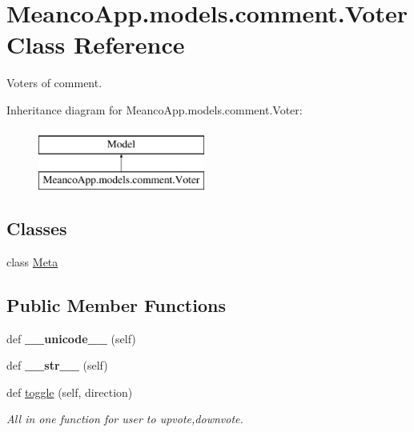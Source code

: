 \hypertarget{class_meanco_app_1_1models_1_1comment_1_1_voter}{}\section{Meanco\+App.\+models.\+comment.\+Voter Class Reference}
\label{class_meanco_app_1_1models_1_1comment_1_1_voter}


Voters of comment.  


Inheritance diagram for Meanco\+App.\+models.\+comment.\+Voter\+:\begin{figure}[H]
\begin{center}
\leavevmode
\includegraphics[height=2.000000cm]{class_meanco_app_1_1models_1_1comment_1_1_voter}
\end{center}
\end{figure}
\subsection*{Classes}
\begin{DoxyCompactItemize}
\item 
class \hyperlink{class_meanco_app_1_1models_1_1comment_1_1_voter_1_1_meta}{Meta}
\end{DoxyCompactItemize}
\subsection*{Public Member Functions}
\begin{DoxyCompactItemize}
\item 
\hypertarget{class_meanco_app_1_1models_1_1comment_1_1_voter_ac3a21d6618b92bfe36088fbae037b51c}{}\label{class_meanco_app_1_1models_1_1comment_1_1_voter_ac3a21d6618b92bfe36088fbae037b51c} 
def {\bfseries \+\_\+\+\_\+unicode\+\_\+\+\_\+} (self)
\item 
\hypertarget{class_meanco_app_1_1models_1_1comment_1_1_voter_ad62e0ca3c42b7eae14431c536f78e6d0}{}\label{class_meanco_app_1_1models_1_1comment_1_1_voter_ad62e0ca3c42b7eae14431c536f78e6d0} 
def {\bfseries \+\_\+\+\_\+str\+\_\+\+\_\+} (self)
\item 
def \hyperlink{class_meanco_app_1_1models_1_1comment_1_1_voter_a3da7c66cab382373d94f0f28788d07a5}{toggle} (self, direction)
\begin{DoxyCompactList}\small\item\em All in one function for user to upvote,downvote. \end{DoxyCompactList}\end{DoxyCompactItemize}
